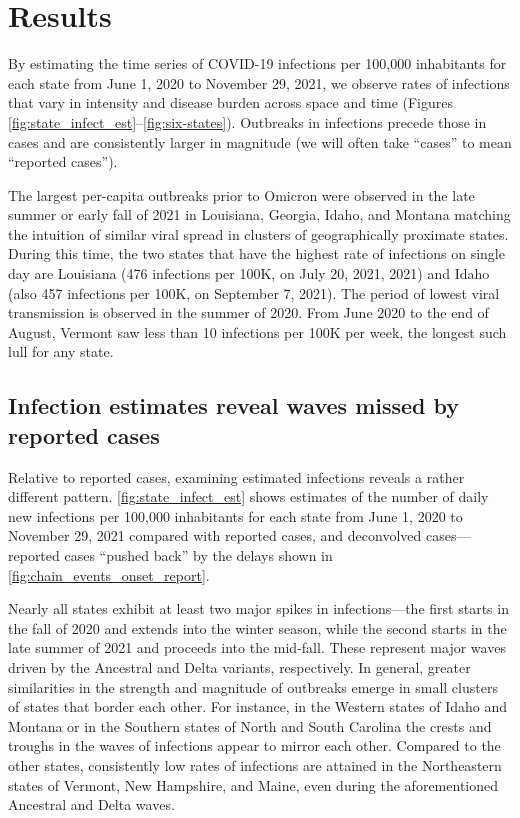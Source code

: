 \section{Results}
\label{sec:results}

By estimating the time series of COVID-19 infections per 100,000 inhabitants
for each \US state from June 1, 2020 to November 29, 2021, we observe rates of
infections that vary in intensity and disease burden across space and time
(Figures \ref{fig:state_infect_est}--\ref{fig:six-states}). Outbreaks in
infections precede those in cases and are consistently larger in magnitude
(we will often take ``cases'' to mean ``reported cases'').

The largest per-capita outbreaks prior to Omicron were observed in the late
summer or early fall of 2021 in Louisiana, Georgia, Idaho, and Montana
matching the intuition of similar viral spread in clusters of geographically
proximate states. During this time, the two states that have the highest rate of
infections on single day are Louisiana (476 infections per 100K, on July 20, 2021,
2021) and Idaho (also 457 infections per 100K, on September 7, 2021). The period
of lowest viral transmission is observed in the summer of 2020. From June 2020
to the end of August, Vermont saw less than 10 infections per 100K per week,
the longest such lull for any state.



\subsection{Infection estimates reveal waves missed by reported cases}
\label{sec:omitted-waves}

Relative to reported cases, examining estimated infections reveals a
rather different pattern. \autoref{fig:state_infect_est} shows
estimates of the number of daily new infections per 100,000 inhabitants for each
\US state from June 1, 2020 to November 29, 2021 compared with reported cases,
and deconvolved cases---reported cases ``pushed back'' by the delays shown in
\autoref{fig:chain_events_onset_report}. 

Nearly all states exhibit at least two major spikes in infections---the first starts
in the fall of 2020 and extends into the winter season, while the second starts
in the late summer of 2021 and proceeds into the mid-fall. These represent major
waves driven by the Ancestral and Delta variants, respectively. 
In general, greater similarities in the strength and magnitude of
outbreaks emerge in small clusters of states that border each other.
For instance, in the Western states of Idaho and Montana 
or in the Southern states of North and South Carolina 
the crests and troughs in the waves of infections appear to mirror each other.
Compared to the other states, consistently low rates of infections are attained in the
Northeastern states of Vermont, New Hampshire, and Maine, even during
the aforementioned Ancestral and Delta waves.


